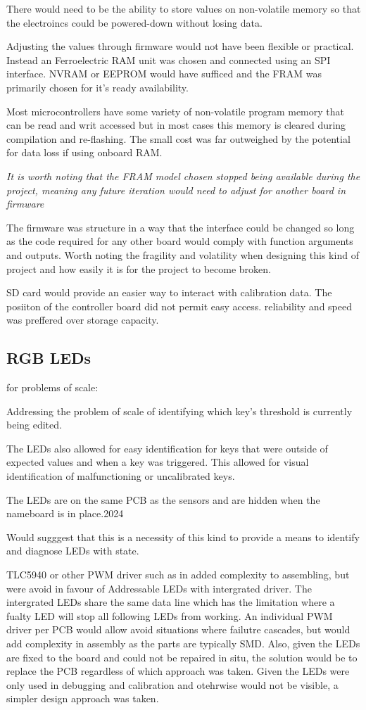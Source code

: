 There would need to be the ability to store values on non-volatile
memory so that the electroincs could be powered-down without losing
data.

Adjusting the values through firmware would not have been flexible or
practical. Instead an Ferroelectric RAM unit was chosen and connected
using an SPI interface. NVRAM or EEPROM would have sufficed and the FRAM
was primarily chosen for it's ready availability.

Most microcontrollers have some variety of non-volatile program memory
that can be read and writ accessed but in most cases this memory is
cleared during compilation and re-flashing. The small cost was far
outweighed by the potential for data loss if using onboard RAM.

\emph{It is worth noting that the FRAM model chosen stopped being
available during the project, meaning any future iteration would need to
adjust for another board in firmware}

The firmware was structure in a way that the interface could be changed
so long as the code required for any other board would comply with
function arguments and outputs. Worth noting the fragility and
volatility when designing this kind of project and how easily it is for
the project to become broken.

SD card would provide an easier way to interact with calibration data.
The posiiton of the controller board did not permit easy access.
reliability and speed was preffered over storage capacity.

\subsection{RGB LEDs}\label{rgb-leds}

for problems of scale:

Addressing the problem of scale of identifying which key's threshold is
currently being edited.

The LEDs also allowed for easy identification for keys that were outside
of expected values and when a key was triggered. This allowed for visual
identification of malfunctioning or uncalibrated keys.

The LEDs are on the same PCB as the sensors and are hidden when the
nameboard is in place.2024

Would sugggest that this is a necessity of this kind to provide a means
to identify and diagnose LEDs with state.

TLC5940 or other PWM driver such as in \cite{McPherson2013} added
complexity to assembling, but were avoid in favour of Addressable LEDs
with intergrated driver. The intergrated LEDs share the same data line
which has the limitation where a fualty LED will stop all following LEDs
from working. An individual PWM driver per PCB would allow avoid
situations where failutre cascades, but would add complexity in assembly
as the parts are typically SMD. Also, given the LEDs are fixed to the
board and could not be repaired in situ, the solution would be to
replace the PCB regardless of which approach was taken. Given the LEDs
were only used in debugging and calibration and otehrwise would not be
visible, a simpler design approach was taken.

